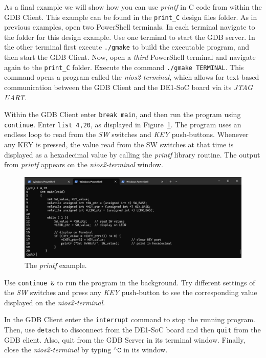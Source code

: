 \documentclass[11pt, twoside, pdftex]{article}
\begin{document}
As a final example we will show how you can use {\it printf} in C code from within the GDB 
Client.  This example can be found in the \texttt{print\_C} design files folder.
As in previous examples, open two PowerShell terminals. In each terminal 
navigate to the folder for this design example. Use one 
terminal to start the GDB server. In the other terminal first execute \texttt{./gmake} to
build the executable program, and then start the GDB Client.
Now, open a {\it third} PowerShell terminal and navigate again to the \texttt{print\_C} folder.
Execute the command \texttt{./gmake TERMINAL}. This command opens a program called the
{\it nios2-terminal}, which allows for text-based communication between the GDB Client and 
the DE1-SoC board via its {\it JTAG UART}.

Within the GDB Client enter \texttt{break main}, and then run the program using \texttt{continue}.
Enter \texttt{list 4,20}, as displayed in Figure~\ref{fig:print_C1}. The program uses an
endless loop to read from the {\it SW} switches and {\it KEY} push-buttons. Whenever any
KEY is pressed, the value read from the SW switches at that time is displayed as a
hexadecimal value by calling the {\it printf} library routine. The output from {\it printf}
appears on the {\it nios2-terminal} window. 

\begin{figure}[h]
    \begin{center}
        \includegraphics[scale=.6]{figures/print_C1.png}
        \caption{The {\it printf} example.}
        \label{fig:print_C1}
    \end{center}
\end{figure}

Use \texttt{continue \&} to run the program in the background. Try different settings of 
the {\it SW} switches and press any {\it KEY} push-button to see the corresponding value 
displayed on the {\it nios2-terminal}.

In the GDB Client enter the \texttt{interrupt} command to stop the running program.
Then, use \texttt{detach} to disconnect from the DE1-SoC board and then
\texttt{quit} from the GDB client. Also, quit from the GDB Server in its terminal window.
Finally, close the {\it nios2-terminal} by typing $^{\wedge}\texttt{C}$ in its window.
\end{document}
